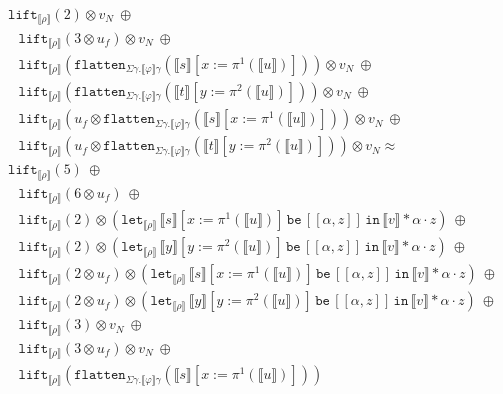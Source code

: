\documentclass[a4paper,UKenglish,cleveref,autoref,numberwithinsect]{lipics-v2019}
\theoremstyle{definition}
\newcommand{\expair}[2]{[#1,#2]}
\newcommand{\flatten}{\mathtt{flatten}}
\newcommand{\lift}{\mathtt{lift}}
\newcommand{\typeinterpret}[1]{\llbracket #1 \rrbracket}
\newcommand{\interpret}[1]{\llbracket #1 \rrbracket}
\newcommand{\xlet}[4]{\mathtt{let}_{#1}\,#2\,\mathtt{be}\,[#3]\,\mathtt{in}\,#4}
\begin{document}
\begin{itemize}
\[\begin{array}{l}
  \lift_{\typeinterpret{\rho}}(2) \otimes v_N\ \oplus \\
  \phantom{A}
  \lift_{\typeinterpret{\rho}}(3 \otimes u_f) \otimes v_N\ \oplus \\
  \phantom{A}
  \lift_{\typeinterpret{\rho}}(\flatten_{\Sigma\gamma.\typeinterpret{
    \varphi}\gamma}(\interpret{s}[x:=\pi^1(\interpret{u})]))
    \otimes v_N\ \oplus \\
  \phantom{A}
  \lift_{\typeinterpret{\rho}}(\flatten_{\Sigma\gamma.\typeinterpret{
    \varphi}\gamma}(\interpret{t}[y:=\pi^2(\interpret{u})]))
    \otimes v_N\ \oplus \\
  \phantom{A}
  \lift_{\typeinterpret{\rho}}(u_f \otimes
    \flatten_{\Sigma\gamma.\typeinterpret{\varphi}\gamma}(
    \interpret{s}[x:=\pi^1(\interpret{u})]))
    \otimes v_N\ \oplus \\
  \phantom{A} \lift_{\typeinterpret{\rho}}(u_f \otimes
    \flatten_{\Sigma\gamma.\typeinterpret{
    \varphi}\gamma}(\interpret{t}[y:=\pi^2(\interpret{u})])) \otimes
    v_N \approx \\
  \lift_{\interpret{\rho}}(5)\ \oplus \\
  \phantom{A}
  \lift_{\typeinterpret{\rho}}(6 \otimes u_f)\ \oplus \\
  \phantom{A}
  \lift_{\interpret{\rho}}(2) \otimes
    (\xlet{\typeinterpret{\rho}}{\interpret{s}[x:=\pi^1(
    \interpret{u})]}{\expair{\alpha}{z}}{\interpret{v} * \alpha
    \cdot z})\ \oplus \\
  \phantom{A}
  \lift_{\interpret{\rho}}(2) \otimes
    (\xlet{\typeinterpret{\rho}}{\interpret{y}[y:=\pi^2(
    \interpret{u})]}{\expair{\alpha}{z}}{\interpret{v} * \alpha
    \cdot z})\ \oplus \\
  \phantom{A}
  \lift_{\interpret{\rho}}(2 \otimes u_f) \otimes
    (\xlet{\typeinterpret{\rho}}{\interpret{s}[x:=\pi^1(
    \interpret{u})]}{\expair{\alpha}{z}}{\interpret{v} * \alpha
    \cdot z})\ \oplus \\
  \phantom{A}
  \lift_{\interpret{\rho}}(2 \otimes u_f) \otimes
    (\xlet{\typeinterpret{\rho}}{\interpret{y}[y:=\pi^2(
    \interpret{u})]}{\expair{\alpha}{z}}{\interpret{v} * \alpha
    \cdot z})\ \oplus \\
  \phantom{A}
  \lift_{\typeinterpret{\rho}}(3) \otimes v_N\ \oplus \\
  \phantom{A}
  \lift_{\typeinterpret{\rho}}(3 \otimes u_f) \otimes v_N\ \oplus \\
  \phantom{A}
  \lift_{\typeinterpret{\rho}}(\flatten_{\Sigma\gamma.\typeinterpret{
    \varphi}\gamma}(\interpret{s}[x:=\pi^1(\interpret{u})]))

\end{array}\]
\end{itemize}
\end{document}
